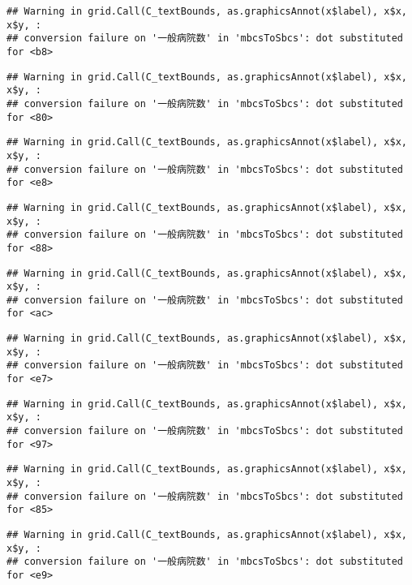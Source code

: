\documentclass[
]{article}
\begin{document}
\begin{verbatim}
## Warning in grid.Call(C_textBounds, as.graphicsAnnot(x$label), x$x, x$y, :
## conversion failure on '一般病院数' in 'mbcsToSbcs': dot substituted for <b8>
\end{verbatim}

\begin{verbatim}
## Warning in grid.Call(C_textBounds, as.graphicsAnnot(x$label), x$x, x$y, :
## conversion failure on '一般病院数' in 'mbcsToSbcs': dot substituted for <80>
\end{verbatim}

\begin{verbatim}
## Warning in grid.Call(C_textBounds, as.graphicsAnnot(x$label), x$x, x$y, :
## conversion failure on '一般病院数' in 'mbcsToSbcs': dot substituted for <e8>
\end{verbatim}

\begin{verbatim}
## Warning in grid.Call(C_textBounds, as.graphicsAnnot(x$label), x$x, x$y, :
## conversion failure on '一般病院数' in 'mbcsToSbcs': dot substituted for <88>
\end{verbatim}

\begin{verbatim}
## Warning in grid.Call(C_textBounds, as.graphicsAnnot(x$label), x$x, x$y, :
## conversion failure on '一般病院数' in 'mbcsToSbcs': dot substituted for <ac>
\end{verbatim}

\begin{verbatim}
## Warning in grid.Call(C_textBounds, as.graphicsAnnot(x$label), x$x, x$y, :
## conversion failure on '一般病院数' in 'mbcsToSbcs': dot substituted for <e7>
\end{verbatim}

\begin{verbatim}
## Warning in grid.Call(C_textBounds, as.graphicsAnnot(x$label), x$x, x$y, :
## conversion failure on '一般病院数' in 'mbcsToSbcs': dot substituted for <97>
\end{verbatim}

\begin{verbatim}
## Warning in grid.Call(C_textBounds, as.graphicsAnnot(x$label), x$x, x$y, :
## conversion failure on '一般病院数' in 'mbcsToSbcs': dot substituted for <85>
\end{verbatim}

\begin{verbatim}
## Warning in grid.Call(C_textBounds, as.graphicsAnnot(x$label), x$x, x$y, :
## conversion failure on '一般病院数' in 'mbcsToSbcs': dot substituted for <e9>
\end{verbatim}
\end{document}
